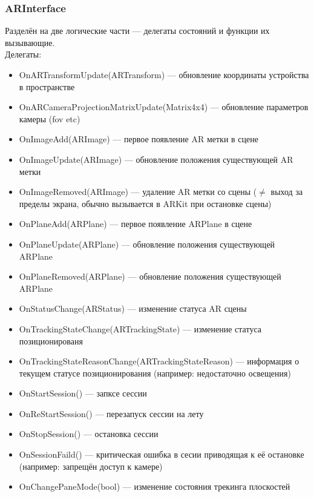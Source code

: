 \documentclass[a4paper, 11pt, titlepage]{article}
\begin{document}
      \subsubsection{ARInterface}
        Разделён на две логические части --- делегаты состояний и функции их вызывающие. \\
        Делегаты:
        \begin{itemize}
          \item OnARTransformUpdate(ARTransform) --- обновление координаты устройства в пространстве
          \item OnARCameraProjectionMatrixUpdate(Matrix4x4) --- обновление параметров камеры (fov etc)
          \item OnImageAdd(ARImage) --- первое появление AR метки в сцене 
          \item OnImageUpdate(ARImage) --- обновление положения существующей AR метки
          \item OnImageRemoved(ARImage) --- удаление AR метки со сцены ($\neq$ выход за пределы экрана, обычно вызывается в ARKit при остановке сцены)
          \item OnPlaneAdd(ARPlane) --- первое появление ARPlane в сцене 
          \item OnPlaneUpdate(ARPlane) --- обновление положения существующей ARPlane
          \item OnPlaneRemoved(ARPlane) --- обновление положения существующей ARPlane
          \item OnStatusChange(ARStatus) --- изменение статуса AR сцены 
          \item OnTrackingStateChange(ARTrackingState) --- изменение статуса позиционированя
          \item OnTrackingStateReasonChange(ARTrackingStateReason) --- информация о текущем статусе позиционирования (например: недостаточно освещения)
          \item OnStartSession() --- запксе сессии
          \item OnReStartSession() --- перезапуск сессии на лету 
          \item OnStopSession() --- остановка сессии
          \item OnSessionFaild() --- критическая ошибка в сесии приводящая к её остановке (например: запрещён доступ к камере)
          \item OnChangePaneMode(bool) --- изменение состояния трекинга плоскостей 
        \end{itemize}
\end{document}
